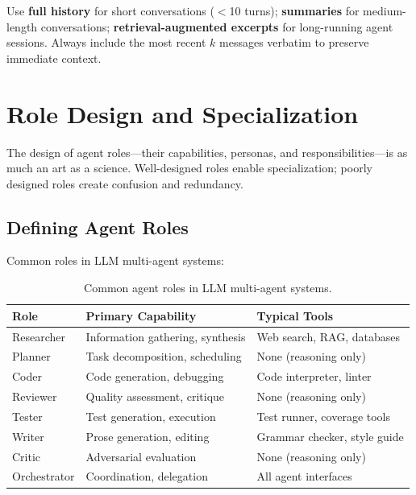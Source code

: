 \begin{keybox}
Use \textbf{full history} for short conversations ($<$10 turns); \textbf{summaries} for medium-length conversations; \textbf{retrieval-augmented excerpts} for long-running agent sessions. Always include the most recent $k$ messages verbatim to preserve immediate context.
\end{keybox}

\section{Role Design and Specialization}
\label{subsec:role-design}

The design of agent roles---their capabilities, personas, and responsibilities---is as much an art as a science. Well-designed roles enable specialization; poorly designed roles create confusion and redundancy.

\subsection{Defining Agent Roles}
\label{defining-agent-roles}

Common roles in LLM multi-agent systems:

\begin{table}[ht!]
\centering
\caption{Common agent roles in LLM multi-agent systems.}
\begin{tabular}{@{}lp{5cm}p{8cm}@{}}
\toprule
\textbf{Role} & \textbf{Primary Capability} & \textbf{Typical Tools} \\
\midrule
Researcher & Information gathering, synthesis & Web search, RAG, databases \\
Planner & Task decomposition, scheduling & None (reasoning only) \\
Coder & Code generation, debugging & Code interpreter, linter \\
Reviewer & Quality assessment, critique & None (reasoning only) \\
Tester & Test generation, execution & Test runner, coverage tools \\
Writer & Prose generation, editing & Grammar checker, style guide \\
Critic & Adversarial evaluation & None (reasoning only) \\
Orchestrator & Coordination, delegation & All agent interfaces \\
\bottomrule
\end{tabular}
\end{table}

